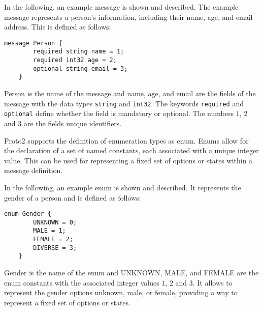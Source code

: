 \documentclass[../MasterThesis.tex]{subfiles}
\begin{document}
\begin{description}[font=\normalfont\color{RedViolet!80!black}, style=nextline]
In the following, an example message is shown and described.
The example message represents a person's information, including their name, age, and email address. This is defined as follows:

\begin{lstlisting}[style=protobufStyle, numbers=none]
	message Person {
		required string name = 1;
		required int32 age = 2;
		optional string email = 3;
	}
\end{lstlisting}

Person is the name of the message and name, age, and email are the fields of the message with the data types \texttt{string} and \texttt{int32}.
The keywords \texttt{required} and \texttt{optional} define whether the field is mandatory or optional.
The numbers $1$, $2$ and $3$ are the fields unique identifiers.


\item[Enums] 

Proto2 supports the definition of enumeration types as enum.
Enums allow for the declaration of a set of named constants, each associated with a unique integer value.
This can be used for representing a fixed set of options or states within a message definition.~\cite{protobuffer, proto2_doc}

In the following, an example enum is shown and described. 
It represents the gender of a person and is defined as follows:

\begin{lstlisting}[style=protobufStyle, numbers=none]
	enum Gender {
		UNKNOWN = 0;
		MALE = 1;
		FEMALE = 2;
		DIVERSE = 3;
	}
\end{lstlisting}

Gender is the name of the enum and UNKNOWN, MALE, and FEMALE are the enum constants with the associated integer values $1$, $2$ and $3$.
It allows to represent the gender options unknown, male, or female, providing a way to represent a fixed set of options or states.



\end{description}


	
\end{document}
